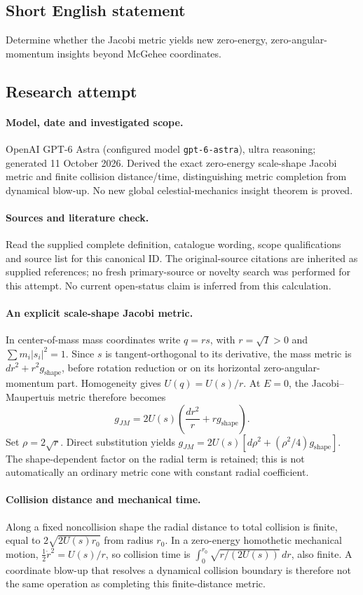\documentclass[11pt]{article}
\begin{document}
\subsection{Short English statement}
Determine whether the Jacobi metric yields new zero-energy, zero-angular-momentum insights beyond McGehee coordinates.
\subsection{Research attempt}
\paragraph{Model, date and investigated scope.}
OpenAI GPT-6 Astra (configured model \texttt{gpt-6-astra}), ultra reasoning; generated 11 October 2026. Derived the exact zero-energy scale-shape Jacobi metric and finite collision distance/time, distinguishing metric completion from dynamical blow-up. No new global celestial-mechanics insight theorem is proved.

\paragraph{Sources and literature check.}
Read the supplied complete definition, catalogue wording, scope qualifications and source list for this canonical ID. The original-source citations are inherited as supplied references; no fresh primary-source or novelty search was performed for this attempt. No current open-status claim is inferred from this calculation.

\paragraph{An explicit scale-shape Jacobi metric.}In center-of-mass mass coordinates write \(q=rs\), with \(r=\sqrt I>0\) and \(\sum m_i|s_i|^2=1\). Since \(s\) is tangent-orthogonal to its derivative, the mass metric is \(dr^2+r^2g_{\mathrm{shape}}\), before rotation reduction or on its horizontal zero-angular-momentum part. Homogeneity gives \(U(q)=U(s)/r\). At \(E=0\), the Jacobi--Maupertuis metric therefore becomes
\[g_{JM}=2U(s)\left(\frac{dr^2}{r}+r g_{\mathrm{shape}}\right).
\]
Set \(\rho=2\sqrt r\). Direct substitution yields \(g_{JM}=2U(s)[d\rho^2+(\rho^2/4)g_{\mathrm{shape}}]\). The shape-dependent factor on the radial term is retained; this is not automatically an ordinary metric cone with constant radial coefficient.
\paragraph{Collision distance and mechanical time.}Along a fixed noncollision shape the radial distance to total collision is finite, equal to \(2\sqrt{2U(s)r_0}\) from radius \(r_0\). In a zero-energy homothetic mechanical motion, \(\tfrac12\dot r^2=U(s)/r\), so collision time is \(\int_0^{r_0}\sqrt{r/(2U(s))}\,dr\), also finite. A coordinate blow-up that resolves a dynamical collision boundary is therefore not the same operation as completing this finite-distance metric.
\end{document}
